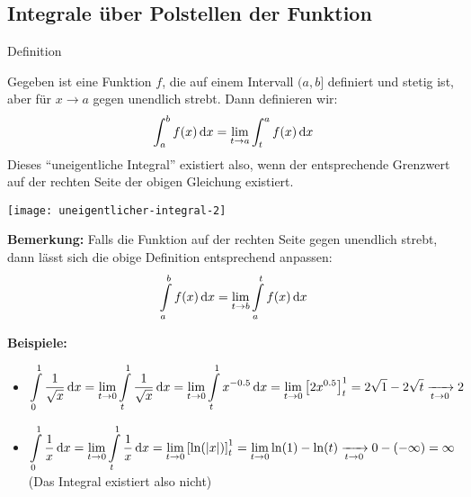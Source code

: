 \subsection{Integrale über Polstellen der Funktion}\label{subsec:integrale-uber-polstellen-der-funktion}

\begin{definition}{Definition}
    \begin{multicols}{2}
        Gegeben ist eine Funktion $f$, die auf einem Intervall $(a, b]$ definiert und stetig ist, aber für $x \rightarrow a$ gegen unendlich strebt.
        Dann definieren wir: \[\int_{a}^{b} f(x) \,\mathrm{d}x = \lim_{t \rightarrow a} \int_{t}^{a} f(x) \,\mathrm{d}x\]
        Dieses ``uneigentliche Integral'' existiert also, wenn der entsprechende Grenzwert auf der rechten Seite der obigen Gleichung existiert.

        \begin{center}
            \texttt{[image: uneigentlicher-integral-2]}
        \end{center}
    \end{multicols}
\end{definition}

\textbf{Bemerkung:} Falls die Funktion auf der rechten Seite gegen unendlich strebt, dann lässt sich die obige Definition entsprechend anpassen:
\[\int \limits_{a}^{b} f(x) \,\mathrm{d}x = \lim_{t \to b} \int \limits_{a}^{t} f(x) \,\mathrm{d}x\]

\textbf{Beispiele:}
\begin{itemize}
    \item $\displaystyle \int \limits_{0}^{1} \frac{1}{\sqrt{x}} \,\mathrm{d}x = \lim_{t \to 0} \int \limits_{t}^{1} \frac{1}{\sqrt {x}} \,\mathrm{d}x = \lim_{t \to 0} \int \limits_{t}^{1} x^{-0.5} \,\mathrm{d}x = \lim_{t \to 0} \left[ 2x^{0.5} \right]_{t}^{1} = 2 \sqrt{1} - 2 \sqrt {t} \xrightarrow[t \to 0]{} 2$
    \item $\displaystyle \int \limits_{0}^{1} \frac{1}{x} \,\mathrm{d}x = \lim_{t \to 0} \int \limits_{t}^{1} \frac{1}{x} \,\mathrm{d}x = \lim_{t \to 0} \left[ \ln(|x|) \right]_{t}^{1} = \lim_{t \to 0} \ln(1) - \ln(t) \xrightarrow[t \to 0]{} 0 - (-\infty) = \infty$ \\
    (Das Integral existiert also nicht)
\end{itemize}